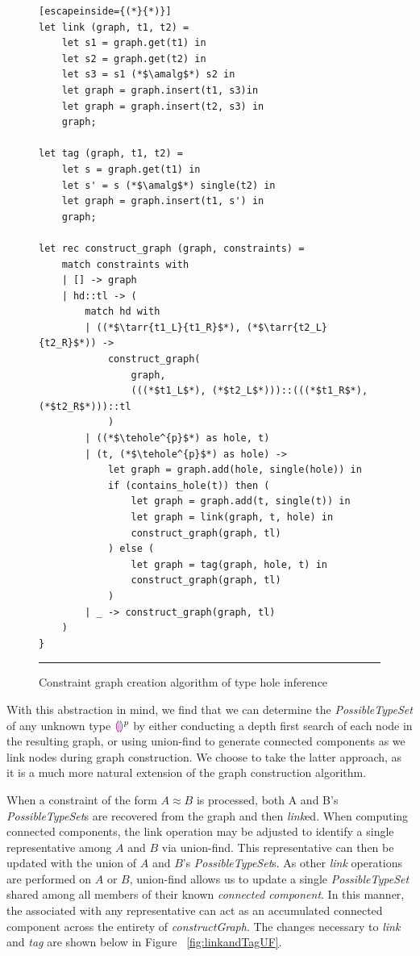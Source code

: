 \begin{figure}[htbp]
\begin{lstlisting}[escapeinside={(*}{*)}]
let link (graph, t1, t2) =
    let s1 = graph.get(t1) in
    let s2 = graph.get(t2) in
    let s3 = s1 (*$\amalg$*) s2 in
    let graph = graph.insert(t1, s3)in
    let graph = graph.insert(t2, s3) in
    graph;

let tag (graph, t1, t2) =
    let s = graph.get(t1) in
    let s' = s (*$\amalg$*) single(t2) in
    let graph = graph.insert(t1, s') in 
    graph;

let rec construct_graph (graph, constraints) =
    match constraints with
    | [] -> graph
    | hd::tl -> (
        match hd with
        | ((*$\tarr{t1_L}{t1_R}$*), (*$\tarr{t2_L}{t2_R}$*)) ->
            construct_graph(
                graph, 
                (((*$t1_L$*), (*$t2_L$*)))::(((*$t1_R$*), (*$t2_R$*)))::tl
            )
        | ((*$\tehole^{p}$*) as hole, t)
        | (t, (*$\tehole^{p}$*) as hole) ->
            let graph = graph.add(hole, single(hole)) in
            if (contains_hole(t)) then (
                let graph = graph.add(t, single(t)) in
                let graph = link(graph, t, hole) in
                construct_graph(graph, tl)
            ) else (
                let graph = tag(graph, hole, t) in
                construct_graph(graph, tl)
            )
        | _ -> construct_graph(graph, tl)
    )
}

\end{lstlisting}
\vspace{-4px}
 \hrule
\caption{Constraint graph creation algorithm of type hole inference}
\label{fig:algcode}
\end{figure}

With this abstraction in mind, we find that we can determine the \textit{PossibleTypeSet} of any unknown type $\textcolor{violet}{\llparenthesis}\textcolor{violet}{\rrparenthesis}^{p}$ by either conducting a depth first search of each node in the resulting graph, or using union-find to generate connected components as we link nodes during graph construction. We choose to take the latter approach, as it is a much more natural extension of the graph construction algorithm.

When a constraint of the form $A \approx B$ is processed, both A and B's \textit{PossibleTypeSet}s are recovered from the graph and then \textit{link}ed. When computing connected components, the link operation may be adjusted to identify a single representative among $A$ and $B$ via union-find. This representative can then be updated with the union of $A$ and $B$'s \textit{PossibleTypeSet}s. As other \textit{link} operations are performed on $A$ or $B$, union-find allows us to update a single \textit{PossibleTypeSet} shared among all members of their known \textit{connected component}. In this manner, the  associated with any representative can act as an accumulated connected component across the entirety of \textit{constructGraph}. The changes necessary to \textit{link} and \textit{tag} are shown below in Figure ~\ref{fig:linkandTagUF}.

